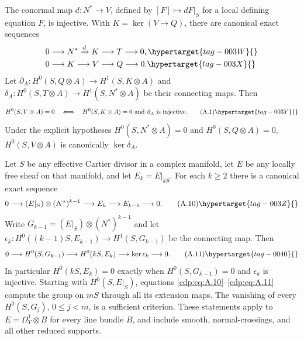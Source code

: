 \begin{proposition}\hypertarget{tag-01AD}{}\label{cdp:st:A.1.1}

\label{wbII:prop:criterion}\label{wbII:prop:filtration}\label{wbII:lem:conormal}\label{wbII:lem:conormal-injective}\label{wbII:prop:missing-global-section-criterion}\label{wbII:prop:missing-cotangent-filtration}
The conormal map $d:N^*\to V$, defined by $[F]\mapsto dF|_S$ for a local defining equation $F$, is injective. With $K=\ker(V\to Q)$, there are canonical exact sequences
\begin{align}
0&\longrightarrow N^*\xrightarrow{d}K\longrightarrow T\longrightarrow0,
\hypertarget{tag-003W}{}\label{cdp:A:filtration1}\\
0&\longrightarrow K\longrightarrow V\longrightarrow Q\longrightarrow0.
\hypertarget{tag-003X}{}\label{cdp:A:filtration2}
\end{align}
Let $\partial_A:H^0(S,Q\otimes A)\to H^1(S,K\otimes A)$ and $\delta_A:H^0(S,T\otimes A)\to H^1(S,N^*\otimes A)$ be their connecting maps. Then
\[
 H^0(S,V\otimes A)=0
 \quad\Longleftrightarrow\quad
 H^0(S,K\otimes A)=0\ \hbox{and}\ \partial_A\hbox{ is injective}.
\tag{A.1}\hypertarget{tag-003Y}{}\label{cdp:eq:A.1}
\]
Under the explicit hypotheses $H^0(S,N^*\otimes A)=0$ and $H^0(S,Q\otimes A)=0$, $H^0(S,V\otimes A)$ is canonically $\ker\delta_A$.
\end{proposition}

\begin{proposition}\hypertarget{tag-01AL}{}\label{cdp:st:A.3.1}


Let $S$ be any effective Cartier divisor in a complex manifold, let $E$ be any locally free sheaf on that manifold, and let $E_k=E|_{kS}$. For each $k\ge2$ there is a canonical exact sequence
\[
0\longrightarrow (E|_S)\otimes(N^*)^{k-1}
 \longrightarrow E_k\longrightarrow E_{k-1}\longrightarrow0.
\tag{A.10}\hypertarget{tag-003Z}{}\label{cdp:eq:A.10}
\]
Write $G_{k-1}=(E|_S)\otimes(N^*)^{k-1}$ and let
$\epsilon_k:H^0((k-1)S,E_{k-1})\to H^1(S,G_{k-1})$
be the connecting map. Then
\[
0\longrightarrow H^0(S,G_{k-1})\longrightarrow H^0(kS,E_k)
 \longrightarrow\ker\epsilon_k\longrightarrow0.
\tag{A.11}\hypertarget{tag-0040}{}\label{cdp:eq:A.11}
\]
In particular $H^0(kS,E_k)=0$ exactly when $H^0(S,G_{k-1})=0$ and $\epsilon_k$ is injective. Starting with $H^0(S,E|_S)$, equations \eqref{cdp:eq:A.10}--\eqref{cdp:eq:A.11} compute the group on $mS$ through all its extension maps. The vanishing of every $H^0(S,G_j)$, $0\le j<m$, is a sufficient criterion. These statements apply to $E=\Omega_Y^1\otimes B$ for every line bundle $B$, and include smooth, normal-crossings, and all other reduced supports.
\end{proposition}

